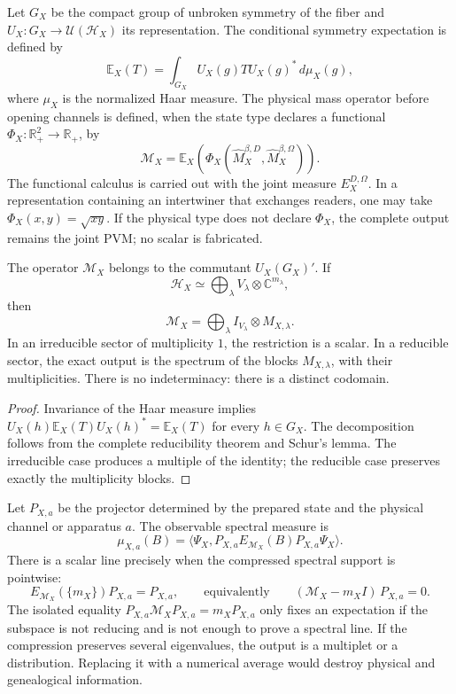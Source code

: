 Let \(G_X\) be the compact group of unbroken symmetry of the fiber and
\(U_X:G_X\to\mathcal U(\mathcal H_X)\) its representation. The conditional
symmetry expectation is defined by
\[
 \mathbb E_X(T)
 =\int_{G_X}U_X(g)TU_X(g)^*\,d\mu_X(g),
\]
where \(\mu_X\) is the normalized Haar measure. The physical mass operator
before opening channels is defined, when the state type declares a
functional \(\Phi_X:\mathbb R_+^2\to\mathbb R_+\), by
\[
 \mathcal M_X
 =\mathbb E_X\!\left(
   \Phi_X(\widehat M_X^{\beta,D},\widehat M_X^{\beta,\Omega})
  \right).
\]
The functional calculus is carried out with the joint measure
\(E_X^{D,\Omega}\). In a representation containing an intertwiner that
exchanges readers, one may take \(\Phi_X(x,y)=\sqrt{xy}\). If the physical
type does not declare \(\Phi_X\), the complete output remains the joint PVM;
no scalar is fabricated.

\begin{theorem}
The operator \(\mathcal M_X\) belongs to the commutant
\(U_X(G_X)'\). If
\[
 \mathcal H_X\simeq
 \bigoplus_\lambda V_\lambda\otimes\mathbb C^{m_\lambda},
\]
then
\[
 \mathcal M_X=
 \bigoplus_\lambda I_{V_\lambda}\otimes M_{X,\lambda}.
\]
In an irreducible sector of multiplicity \(1\), the restriction is a scalar.
In a reducible sector, the exact output is the spectrum of the blocks
\(M_{X,\lambda}\), with their multiplicities. There is no indeterminacy:
there is a distinct codomain.
\end{theorem}

\begin{proof}
Invariance of the Haar measure implies
\(U_X(h)\mathbb E_X(T)U_X(h)^*=\mathbb E_X(T)\) for every \(h\in G_X\).
The decomposition follows from the complete reducibility theorem and Schur's
lemma. The irreducible case produces a multiple of the identity; the
reducible case preserves exactly the multiplicity blocks.
\end{proof}

Let \(P_{X,a}\) be the projector determined by the prepared state and the physical channel or
apparatus \(a\). The observable spectral measure is
\[
 \mu_{X,a}(B)=
 \langle\Psi_X,
 P_{X,a}E_{\mathcal M_X}(B)P_{X,a}\Psi_X\rangle.
\]
There is a scalar line precisely when the compressed spectral support is
pointwise:
\[
 E_{\mathcal M_X}(\{m_X\})P_{X,a}=P_{X,a},
 \qquad\text{equivalently}\qquad
 (\mathcal M_X-m_X I)\,P_{X,a}=0.
\]
The isolated equality
\(P_{X,a}\mathcal M_X P_{X,a}=m_X P_{X,a}\) only fixes an expectation if the
subspace is not reducing and is not enough to prove a spectral line.
If the compression preserves several eigenvalues, the output is a multiplet or a
distribution. Replacing it with a numerical average would destroy physical
and genealogical information.

